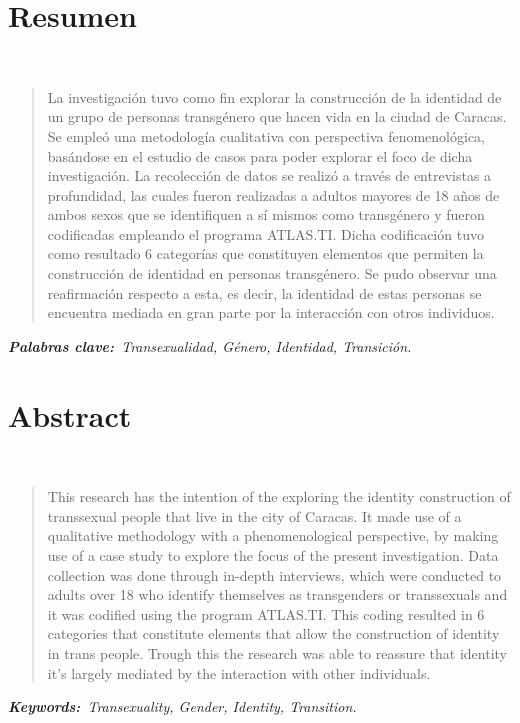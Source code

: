 
\chapter{Resumen}
\begin{center}
	\large\scshape\thetitle\
\end{center}

\begin{quote}
La investigación tuvo como fin explorar la construcción de la identidad
de un grupo de personas transgénero que hacen vida en la ciudad de Caracas.
Se empleó una metodología cualitativa con perspectiva fenomenológica, basándose
en el estudio de casos para poder explorar el foco de dicha investigación.
La recolección de datos se realizó a través de entrevistas a profundidad, las
cuales fueron realizadas a adultos mayores de 18 años de ambos sexos que se
identifiquen a sí mismos como transgénero y fueron codificadas empleando el
programa ATLAS.TI\@.
Dicha codificación tuvo como resultado 6 categorías que constituyen elementos
que permiten la construcción de identidad en personas transgénero.
Se pudo observar una reafirmación respecto a esta, es decir, la identidad de
estas personas se encuentra mediada en gran parte por la interacción con otros
individuos.
\end{quote}

\itshape\textbf{Palabras clave:}\normalfont{}\ Transexualidad, Género, Identidad,
Transición.

\chapter{Abstract}

\begin{center}
	\large\scshape\theengtitle\
\end{center}

\begin{quote}
This research has the intention of the exploring the identity construction of
transsexual people that live in the city of Caracas.
It made use of a qualitative methodology with a phenomenological perspective, by
making use of a case study to explore the focus of the present investigation.
Data collection was done through in-depth interviews, which were conducted to
adults over 18 who identify themselves as transgenders or transsexuals and it
was codified using the program ATLAS.TI\@.
This coding resulted in 6 categories that constitute elements that allow the
construction of identity in trans people.
Trough this the research was able to reassure that identity it's largely
mediated by the interaction with other individuals.

\end{quote}

\itshape\textbf{Keywords:}\normalfont{}\ Transexuality, Gender, Identity,
Transition.

\cleardoublepage\
